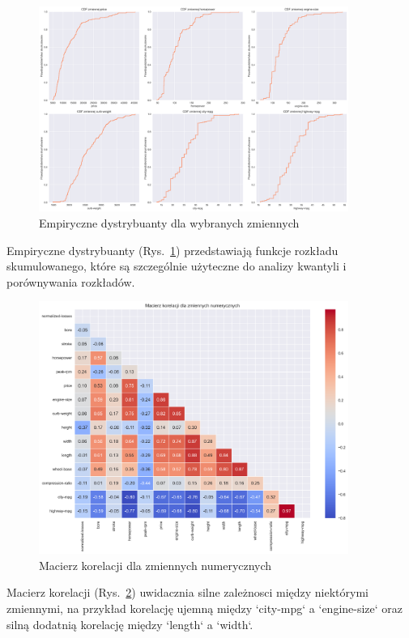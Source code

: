 \documentclass[12pt,a4paper]{article}
\begin{document}
\begin{figure}[H]
    \centering
    \includegraphics[width=0.9\textwidth]{figures/cdf_plots.png}
    \caption{Empiryczne dystrybuanty dla wybranych zmiennych}
    \label{fig:cdf_plots}
\end{figure}

Empiryczne dystrybuanty (Rys.~\ref{fig:cdf_plots}) przedstawiają funkcje rozkładu skumulowanego, które są szczególnie użyteczne do analizy kwantyli i porównywania rozkładów.

\begin{figure}[H]
    \centering
    \includegraphics[width=0.9\textwidth]{figures/correlation_heatmap.png}
    \caption{Macierz korelacji dla zmiennych numerycznych}
    \label{fig:correlation_heatmap}
\end{figure}

Macierz korelacji (Rys.~\ref{fig:correlation_heatmap}) uwidacznia silne zależnosci między niektórymi zmiennymi, na przykład korelację ujemną między `city-mpg` a `engine-size` oraz silną dodatnią korelację między `length` a `width`.
\end{document}
